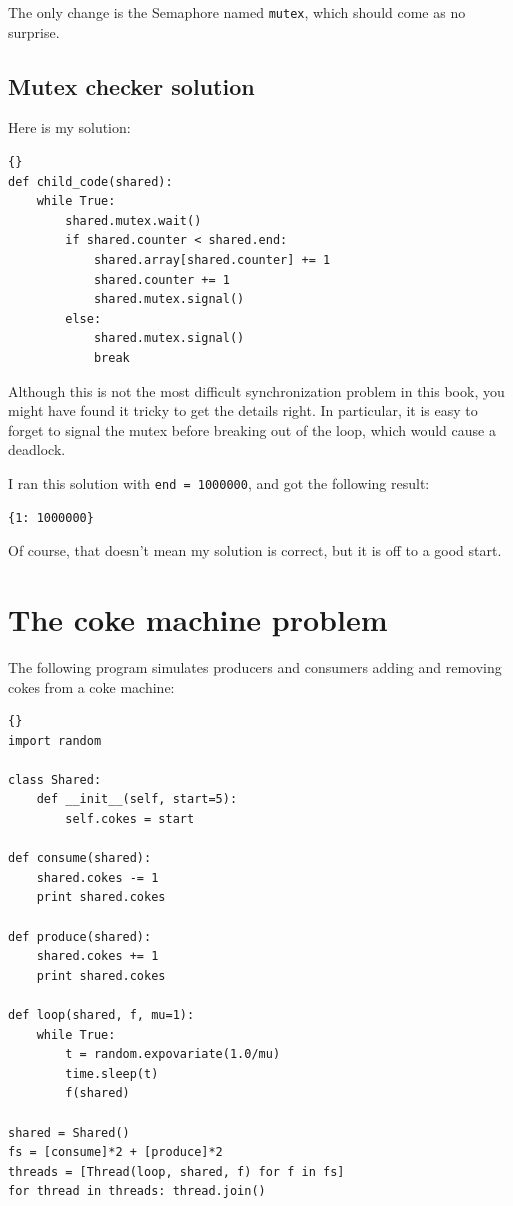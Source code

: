 \documentclass{book}
\newcommand{\clearemptydoublepage}{\newpage\cleardoublepage}
\begin{document}
The only change is the Semaphore named {\tt mutex}, which should
come as no surprise.

\clearemptydoublepage
\subsection {Mutex checker solution}

Here is my solution:

\begin{latin}
\begin{lstlisting}[title={}]{}
def child_code(shared):
    while True:
        shared.mutex.wait()
        if shared.counter < shared.end:
            shared.array[shared.counter] += 1
            shared.counter += 1
            shared.mutex.signal()
        else:
            shared.mutex.signal()
            break
\end{lstlisting}
\end{latin}

Although this is not the most difficult synchronization problem
in this book, you might have found it tricky to get the details
right.  In particular, it is easy to forget to signal the mutex
before breaking out of the loop, which would cause a deadlock.

I ran this solution with {\tt end = 1000000}, and got the
following result:

\begin{verbatim}
{1: 1000000}
\end{verbatim}

Of course, that doesn't mean my solution is correct, but it is
off to a good start.


\clearemptydoublepage
\section {The coke machine problem}

The following program simulates producers and consumers
adding and removing cokes from a coke machine:

\begin{latin}
\begin{lstlisting}[title={}]{}
import random

class Shared:
    def __init__(self, start=5):
        self.cokes = start

def consume(shared):
    shared.cokes -= 1
    print shared.cokes

def produce(shared):
    shared.cokes += 1
    print shared.cokes

def loop(shared, f, mu=1):
    while True:
        t = random.expovariate(1.0/mu)
        time.sleep(t)
        f(shared)

shared = Shared()
fs = [consume]*2 + [produce]*2 
threads = [Thread(loop, shared, f) for f in fs]
for thread in threads: thread.join()
\end{lstlisting}
\end{latin}
\end{document}
